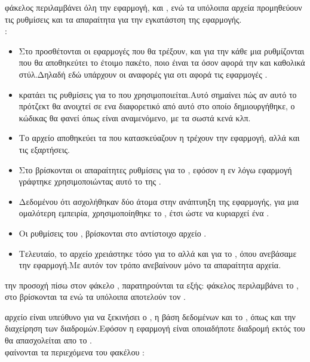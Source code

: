  φάκελος  περιλαμβάνει όλη την εφαρμογή,  και , ενώ τα υπόλοιπα αρχεία προμηθεύουν τις ρυθμίσεις και τα απαραίτητα για την εγκατάστση της εφαρμογής.\\
:
\begin{itemize}
	\item Στο  προσθέτονται οι εφαρμογές που θα τρέξουν, και για την κάθε μια ρυθμίζονται που θα αποθηκεύτει το έτοιμο πακέτο, ποιο έιναι τα  όσον αφορά την  και καθολικά στύλ.Δηλαδή εδώ υπάρχουν οι αναφορές για οτι αφορά τις εφαρμογές .
	\item {} κρατάει τις ρυθμίσεις για το  που χρησιμοποιείται.Αυτό σημαίνει πώς αν αυτό το πρότζεκτ θα ανοιχτεί σε ενα διαφορετικό  από αυτό στο οποίο δημιουργήθηκε, ο κώδικας θα φανεί όπως είναι αναμενόμενο, με τα σωστά κενά κλπ.
	\item Το αρχείο  αποθηκεύει τα  που κατασκεύαζουν η τρέχουν την εφαρμογή, αλλά και τις εξαρτήσεις.
	\item Στο  βρίσκονται οι απαραίτητες ρυθμίσεις για το , εφόσον η εν λόγω εφαρμογή γράφτηκε χρησιμοποιώντας αυτό το  της .
	\item Δεδομένου ότι ασχολήθηκαν δύο άτομα στην ανάπτυηξη της εφαρμογής, για μια ομαλότερη εμπειρία, χρησιμοποίηθηκε το , έτσι ώστε να κυριαρχεί ένα . 
	\item Οι ρυθμίσεις του , βρίσκονται στο αντίστοιχο αρχείο .
	\item Τελευταίο, το αρχείο  χρειάστηκε τόσο για το  αλλά και για το , όπου ανεβάσαμε την εφαρμογή.Με αυτόν τον τρόπο ανεβαίνουν μόνο τα απαραίτητα αρχεία.
\end{itemize}
 την προσοχή πίσω στον φάκελο , παρατηρούνται τα εξής:
 φάκελος  περιλαμβάνει το , στο  βρίσκονται τα  ενώ τα υπόλοιπα αποτελούν τον .

 αρχείο  είναι υπεύθυνο για να ξεκινήσει ο , η βάση δεδομένων και το , όπως και την διαχείρηση των διαδρομών.Εφόσον η εφαρμογή είναι  οποιαδήποτε διαδρομή εκτός του  θα απασχολείται απο το .\\
 φαίνονται τα περιεχόμενα του φακέλου : 

